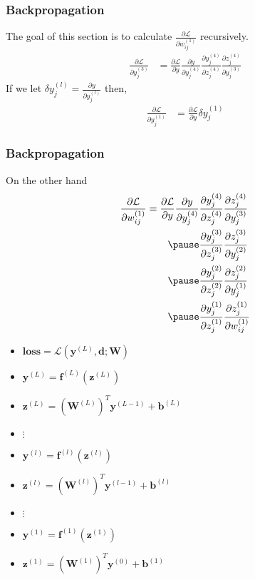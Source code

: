 \documentclass[12pt,aspectratio=169]{beamer}
\begin{document}
\begin{frame}
\frametitle{Backpropagation}
The goal of this section is to calculate $\frac{\partial\mathcal{L}}{\partial w_{ij}^{(1)}}$ recursively. 
\[
\begin{aligned}
\frac{\partial \mathcal{L}}{\partial y_j^{(3)}}&=\frac{\partial \mathcal{L}}{\partial y}\frac{\partial y}{\partial y_j^{(4)}}\frac{\partial y_j^{(4)}}{\partial z_j^{(4)}}\frac{\partial z_j^{(4)}}{\partial y_j^{(3)}}
\end{aligned}
\]
If we let $\delta y_j^{(l)}=\frac{\partial y}{\partial y_j^{(l)}}$ then,
\[
\begin{aligned}
\frac{\partial \mathcal{L}}{\partial y_j^{(1)}}&=\frac{\partial \mathcal{L}}{\partial y}\delta y_j^{(1)}
\end{aligned}
\]
\end{frame}


\begin{frame}
\frametitle{Backpropagation}
On the other hand
\[
\begin{aligned}
\frac{\partial \mathcal{L}}{\partial w_{ij}^{(1)}}=\frac{\partial \mathcal{L}}{\partial y}\frac{\partial y}{\partial y_j^{(4)}}&\frac{\partial y_j^{(4)}}{\partial z_j^{(4)}}\frac{\partial z_j^{(4)}}{\partial y_j^{(3)}}\\ \pause
&\frac{\partial y_j^{(3)}}{\partial z_j^{(3)}}\frac{\partial z_j^{(3)}}{\partial y_j^{(2)}}\\ \pause
&\frac{\partial y_j^{(2)}}{\partial z_j^{(2)}}\frac{\partial z_j^{(2)}}{\partial y_j^{(1)}}\\ \pause
&\frac{\partial y_j^{(1)}}{\partial z_j^{(1)}}\frac{\partial z_j^{(1)}}{\partial w_{ij}^{(1)}}
\end{aligned}
\]

\end{frame}


\begin{frame}
\begin{itemize}
\item $\textbf{loss}=\mathcal{L}(\mathbf{y}^{(L)},\mathbf{d};\mathbf{W})$\pause
\item $\mathbf{y}^{(L)}=\mathbf{f}^{(L)}(\mathbf{z}^{(L)})$\pause
\item $\mathbf{z}^{(L)}=(\mathbf{W}^{(L)})^T\mathbf{y}^{(L-1)}+\mathbf{b}^{(L)}$ \pause
\item $\vdots$
\item $\mathbf{y}^{(l)}=\mathbf{f}^{(l)}(\mathbf{z}^{(l)})$\pause
\item $\mathbf{z}^{(l)}=(\mathbf{W}^{(l)})^T\mathbf{y}^{(l-1)}+\mathbf{b}^{(l)}$ \pause
\item $\vdots$
\item $\mathbf{y}^{(1)}=\mathbf{f}^{(1)}(\mathbf{z}^{(1)})$\pause
\item $\mathbf{z}^{(1)}=(\mathbf{W}^{(1)})^T\mathbf{y}^{(0)}+\mathbf{b}^{(1)}$ \pause

\end{itemize}
\end{frame}
\end{document}
